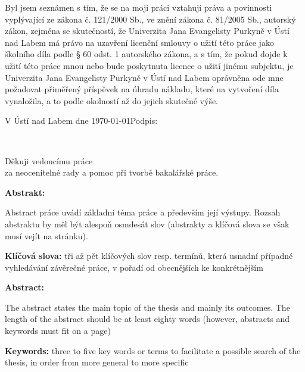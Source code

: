 \documentclass[male,czech,api_bc]{kitheses}
\newcommand{\ZT}[1]{\colorbox{yellow}{\color{red}{#1}}}
\newcommand{\nazevcz}{\ZT{Závěrečná práce na KI PřF UJEP}}        %
\newcommand{\nazeven}{\ZT{Thesis on KI PřF}}     %
\newcommand{\vedouciDAT}{\ZT{RNDr. Jiřímu Škvorovi, Ph.D.}}
\begin{document}
\vspace{0.5em}

Byl jsem seznámen 
s tím, že se na moji práci vztahují práva a povinnosti vyplývající ze
zákona č. 121/2000 Sb., ve znění zákona č. 81/2005 Sb., autorský zákon, zejména se
skutečností, že Univerzita Jana Evangelisty Purkyně v Ústí nad Labem má právo na uzavření
licenční smlouvy o užití této práce jako školního díla podle § 60 odst. 1 autorského zákona, a
s tím, že pokud dojde k užití této práce mnou nebo bude poskytnuta licence o užití jinému
subjektu, je Univerzita Jana Evangelisty Purkyně v Ústí nad Labem oprávněna ode mne
požadovat přiměřený příspěvek na úhradu nákladu, které na vytvoření díla vynaložila, a to
podle okolností až do jejich skutečné výše.

\vspace{2em}

V Ústí nad Labem dne \today   \hfill Podpis: \makebox[4cm][s]{\dotfill}

\cleardoublepage
\thispagestyle{empty}
~
\vfill

\begin{flushright}
    Děkuji vedoucímu práce \ZT{\vedouciDAT}\\ 
    za neocenitelné rady a pomoc při tvorbě bakalářské práce.
\end{flushright}

\cleardoublepage

\textsc{\nazevcz}

\textbf{Abstrakt:}

Abstract práce uvádí základní téma práce a především její výstupy. Rozsah abstraktu by měl být alespoň osmdesát slov (abstrakty a klíčová slova se však musí vejít na stránku).

\textbf{Klíčová slova:} tři až pět klíčových slov resp. termínů, která usnadní případné vyhledávání závěrečné práce, v pořadí od obecnějších ke konkrétnějším

\bigskip


\textsc{\nazeven}

\textbf{Abstract:}

The abstract states the main topic of the thesis and mainly its outcomes. The length of the abstract should be at least eighty words (however, abstracts and keywords must fit on a page)

\textbf{Keywords:} three to five key words or terms to facilitate a possible search of the thesis, in order from more general to more specific
\end{document}
